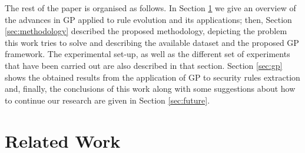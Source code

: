 \documentclass[a4paper,10pt,twocolumn,preprint,3p]{elsarticle}
\begin{document}
The rest of the paper is organised as follows. In Section
\ref{sec:SotA} we give an overview of the advances in GP applied to
rule evolution and its applications; then, Section
\ref{sec:methodology} described the proposed methodology, depicting
the problem this work tries to solve and describing the available
dataset and the proposed GP framework. The experimental set-up, as
well as the different set of experiments that have been carried out
are also described in that section. Section \ref{sec:gp} shows the
obtained results from the application of GP to security rules
extraction and, finally, the conclusions of this work along with some
suggestions about how to continue our research are given in Section
\ref{sec:future}.   

\section{Related Work}
\label{sec:SotA}
\end{document}
